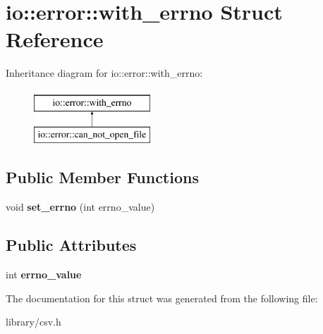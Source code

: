 \hypertarget{structio_1_1error_1_1with__errno}{}\section{io\+:\+:error\+:\+:with\+\_\+errno Struct Reference}
\label{structio_1_1error_1_1with__errno}
Inheritance diagram for io\+:\+:error\+:\+:with\+\_\+errno\+:\begin{figure}[H]
\begin{center}
\leavevmode
\includegraphics[height=2.000000cm]{structio_1_1error_1_1with__errno}
\end{center}
\end{figure}
\subsection*{Public Member Functions}
\begin{DoxyCompactItemize}
\item 
\mbox{\label{structio_1_1error_1_1with__errno_a572cfa4b4a96792cd1d17dc9ad2eb5a9}} 
void {\bfseries set\+\_\+errno} (int errno\+\_\+value)
\end{DoxyCompactItemize}
\subsection*{Public Attributes}
\begin{DoxyCompactItemize}
\item 
\mbox{\label{structio_1_1error_1_1with__errno_a99dcacba02cb53351fe64d7e064406be}} 
int {\bfseries errno\+\_\+value}
\end{DoxyCompactItemize}


The documentation for this struct was generated from the following file\+:\begin{DoxyCompactItemize}
\item 
library/csv.\+h\end{DoxyCompactItemize}
